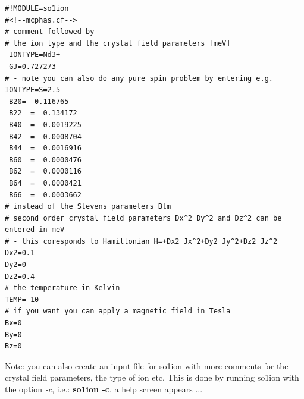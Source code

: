 \begin{verbatim}
#!MODULE=so1ion
#<!--mcphas.cf-->
# comment followed by
# the ion type and the crystal field parameters [meV]
 IONTYPE=Nd3+
 GJ=0.727273
# - note you can also do any pure spin problem by entering e.g. IONTYPE=S=2.5 
 B20=  0.116765                                           
 B22  =  0.134172                                           
 B40  =  0.0019225                                          
 B42  =  0.0008704                                          
 B44  =  0.0016916                                          
 B60  =  0.0000476                                          
 B62  =  0.0000116                                          
 B64  =  0.0000421                                          
 B66  =  0.0003662       
# instead of the Stevens parameters Blm 
# second order crystal field parameters Dx^2 Dy^2 and Dz^2 can be entered in meV
# - this coresponds to Hamiltonian H=+Dx2 Jx^2+Dy2 Jy^2+Dz2 Jz^2
Dx2=0.1
Dy2=0
Dz2=0.4
# the temperature in Kelvin
TEMP= 10
# if you want you can apply a magnetic field in Tesla
Bx=0
By=0
Bz=0
\end{verbatim}

Note: you can also create an input file for so1ion with more comments for the crystal field
parameters, the type of ion etc. This is done by running {\prg so1ion} with the
option {\em -c}, i.e.: {\bf so1ion -c}, a help screen appears ...

